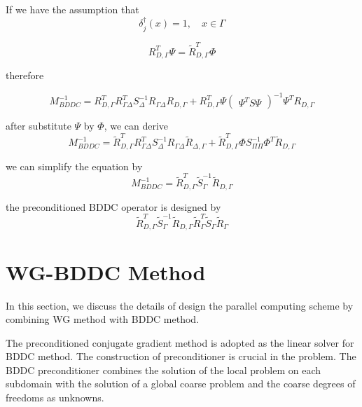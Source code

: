  If we have the assumption that
 \begin{equation}
 \delta^{\dagger}_{j} (x) = 1, \quad x \in \Gamma
 \end{equation}
 
\begin{equation}
R_{D, \Gamma}^{T} \Psi = \tilde{R}_{D, \Gamma}^{T} \Phi
\end{equation}

therefore

\begin{equation}
M_{BDDC}^{-1} = R_{D, \Gamma}^{T} R_{\Gamma \Delta}^{T} S_{\Delta}^{-1} R_{\Gamma \Delta} R_{D, \Gamma} + R_{D, \Gamma}^{T} \Psi 
\begin{pmatrix}
\Psi^{T} S \Psi
\end{pmatrix}^{-1} \Psi^{T} R_{D, \Gamma}
\end{equation}

after substitute $ \Psi $ by $ \Phi $, we can derive
\begin{equation}
M_{BDDC}^{-1} = \tilde{R}_{D, \Gamma}^{T} R_{\Gamma \Delta}^{T} S_{\Delta}^{-1} R_{\Gamma \Delta} \tilde{R}_{\Delta, \Gamma} + \tilde{R}_{D, \Gamma}^{T} \Phi S_{\Pi \Pi}^{-1} \Phi^{T} \tilde{R}_{D, \Gamma}
\end{equation}

we can simplify the equation by 
\begin{equation}
M_{BDDC}^{-1} = \tilde{R}_{D,\Gamma}^{T} \tilde{S}_{\Gamma}^{-1} \tilde{R}_{D, \Gamma}
\end{equation}

the preconditioned BDDC operator is designed by 
\begin{equation}
\tilde{R}_{D, \Gamma}^{T} \tilde{S}_{\Gamma}^{-1} \tilde{R}_{D, \Gamma} \tilde{R}_{\Gamma}^{T}\tilde{S}_{\Gamma}\tilde{R}_{\Gamma}
\end{equation}

\section{WG-BDDC Method}
In this section, we discuss the details of design the parallel computing scheme by combining WG method with BDDC method. 

The preconditioned conjugate gradient method is adopted as the linear solver for BDDC method. The construction of preconditioner is crucial in the problem. The BDDC preconditioner combines the solution of the local problem on each subdomain with the solution of a global coarse problem and the coarse degrees of freedoms as unknowns. 

